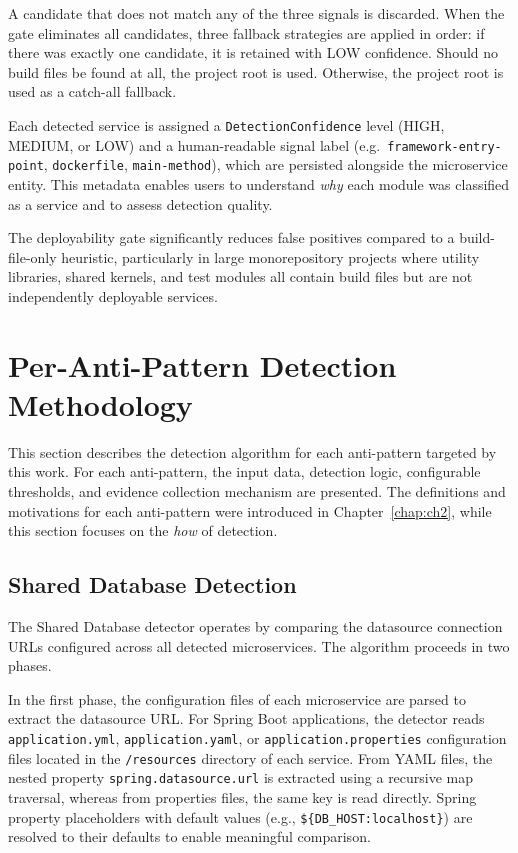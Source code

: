A candidate that does not match any of the three signals is discarded. When the gate eliminates all candidates, three fallback strategies are applied in order: if there was exactly one candidate, it is retained with LOW confidence. Should no build files be found at all, the project root is used. Otherwise, the project root is used as a catch-all fallback.

Each detected service is assigned a \texttt{DetectionConfidence} level (HIGH, MEDIUM, or LOW) and a human-readable signal label (e.g.\ \texttt{framework-entry-point}, \texttt{dockerfile}, \texttt{main-method}), which are persisted alongside the microservice entity. This metadata enables users to understand \textit{why} each module was classified as a service and to assess detection quality.

The deployability gate significantly reduces false positives compared to a build-file-only heuristic, particularly in large monorepository projects where utility libraries, shared kernels, and test modules all contain build files but are not independently deployable services.

\section{Per-Anti-Pattern Detection Methodology}
\label{sec:per-anti-pattern-detection}

\par This section describes the detection algorithm for each anti-pattern targeted by this work. For each anti-pattern, the input data, detection logic, configurable thresholds, and evidence collection mechanism are presented. The definitions and motivations for each anti-pattern were introduced in Chapter~\ref{chap:ch2}, while this section focuses on the \textit{how} of detection.

\subsection{Shared Database Detection}
\label{subsec:detect-shared-database}

\par The Shared Database detector operates by comparing the datasource connection URLs configured across all detected microservices. The algorithm proceeds in two phases.

In the first phase, the configuration files of each microservice are parsed to extract the datasource URL. For Spring Boot applications, the detector reads \texttt{application.yml}, \texttt{application.yaml}, or \texttt{application.properties} configuration files located in the \texttt{/resources} directory of each service. From YAML files, the nested property \texttt{spring.datasource.url} is extracted using a recursive map traversal, whereas from properties files, the same key is read directly. Spring property placeholders with default values (e.g., \texttt{\$\{DB\_HOST:localhost\}}) are resolved to their defaults to enable meaningful comparison.

